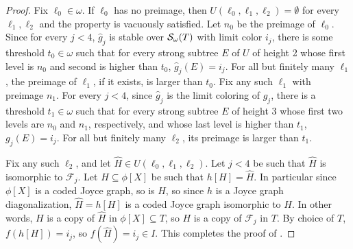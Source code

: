 \begin{proof}
Fix $\ell_0 \in \omega$. If $\ell_0$ has no preimage, then $U(\ell_0, \ell_1, \ell_2) = \emptyset$ for every $\ell_1, \ell_2$ and the property is vacuously satisfied. Let $n_0$ be the preimage of $\ell_0$. Since for every $j < 4$, $\hat{g}_j$ is stable over $\mathcal{S}_{\omega}({T})$ with limit color $i_j$, there is some threshold $t_0 \in \omega$ such that for every strong subtree $E$ of $U$ of height 2 whose first level is $n_0$ and second is higher than $t_0$, $\hat{g}_j(E) = i_j$. For all but finitely many $\ell_1$, the preimage of $\ell_1$, if it exists, is larger than $t_0$. Fix any such $\ell_1$ with preimage $n_1$. For every $j < 4$, since $\hat{g}_j$ is the limit coloring of $g_j$, there is a threshold $t_1 \in \omega$ such that for every strong subtree $E$ of height 3 whose first two levels are $n_0$ and $n_1$, respectively, and whose last level is higher than $t_1$, $g_j(E) = i_j$. 
	For all but finitely many $\ell_2$, its preimage is larger than $t_1$. 
	
	Fix any such $\ell_2$, and let $\hat{H} \in U(\ell_0, \ell_1, \ell_2)$. 
	Let $j < 4$ be such that $\hat{H}$ is isomorphic to $\mathcal{F}_j$. Let $H \subseteq \phi[X]$ be such that $h[H] = \hat{H}$. In particular since $\phi[X]$ is a coded Joyce graph, so is $H$, so since $h$ is a Joyce graph diagonalization, $\hat{H} = h[H]$ is a coded Joyce graph isomorphic to $H$. In other words, $H$ is a copy of $\hat{H}$ in $\phi[X] \subseteq T$, so $H$ is a copy of $\mathcal{F}_j$ in $T$. By choice of $T$, $f(h[H]) = i_j$, so $f(\hat{H}) = i_j \in I$.
This completes the proof of .
\end{proof}


